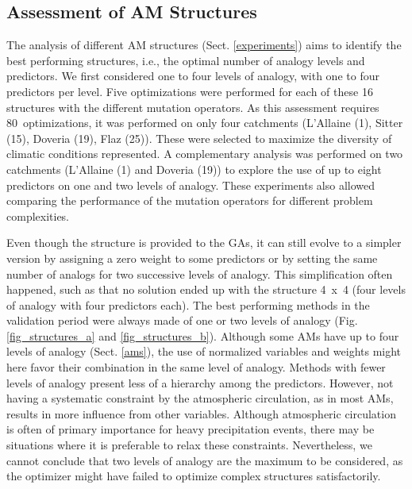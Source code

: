 \documentclass[draft]{agujournal2019}
\begin{document}
\subsection{Assessment of AM Structures}
\label{structures}

The analysis of different AM structures (Sect. \ref{experiments}) aims to identify the best performing structures, i.e., the optimal number of analogy levels and predictors. We first considered one to four levels of analogy, with one to four predictors per level. Five optimizations were performed for each of these 16 structures with the different mutation operators. As this assessment requires 80~optimizations, it was performed on only four catchments (L'Allaine (1), Sitter (15), Doveria (19), Flaz (25)). These were selected to maximize the diversity of climatic conditions represented. A complementary analysis was performed on two catchments (L'Allaine (1) and Doveria (19)) to explore the use of up to eight predictors on one and two levels of analogy. These experiments also allowed comparing the performance of the mutation operators for different problem complexities.

Even though the structure is provided to the GAs, it can still evolve to a simpler version by assigning a zero weight to some predictors or by setting the same number of analogs for two successive levels of analogy. This simplification often happened, such as that no solution ended up with the structure 4~x~4 (four levels of analogy with four predictors each). The best performing methods in the validation period were always made of one or two levels of analogy (Fig. \ref{fig_structures_a} and \ref{fig_structures_b}). Although some AMs have up to four levels of analogy (Sect. \ref{ams}), the use of normalized variables and weights might here favor their combination in the same level of analogy. Methods with fewer levels of analogy present less of a hierarchy among the predictors. However, not having a systematic constraint by the atmospheric circulation, as in most AMs, results in more influence from other variables. Although atmospheric circulation is often of primary importance for heavy precipitation events, there may be situations where it is preferable to relax these constraints. Nevertheless, we cannot conclude that two levels of analogy are the maximum to be considered, as the optimizer might have failed to optimize complex structures satisfactorily.
\end{document}
